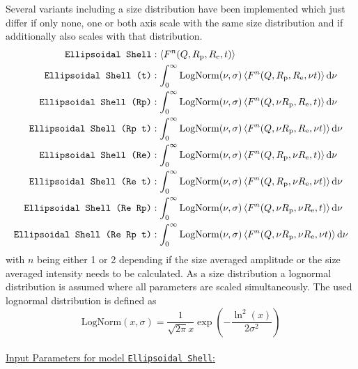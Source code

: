 Several variants including a size distribution have been implemented which just differ if only none, one or both axis scale with the same size distribution and if additionally also scales with that distribution.
\begin{align*}
\text{\texttt{Ellipsoidal Shell}}           &:                                            \left\langle F^n(Q,R_\mathrm{p},R_\mathrm{e},t)\right\rangle\\
\text{\texttt{Ellipsoidal Shell (t)}}       &: \int_0^\infty \mathrm{LogNorm}(\nu,\sigma) \left\langle F^n(Q,R_\mathrm{p},R_\mathrm{e},\nu t)\right\rangle \mathrm{d}\nu\\
\text{\texttt{Ellipsoidal Shell (Rp)}}      &: \int_0^\infty \mathrm{LogNorm}(\nu,\sigma) \left\langle F^n(Q,\nu R_\mathrm{p},R_\mathrm{e}, t)\right\rangle \mathrm{d}\nu\\
\text{\texttt{Ellipsoidal Shell (Rp t)}}    &: \int_0^\infty \mathrm{LogNorm}(\nu,\sigma) \left\langle F^n(Q,\nu R_\mathrm{p},R_\mathrm{e},\nu t)\right\rangle \mathrm{d}\nu\\
\text{\texttt{Ellipsoidal Shell (Re)}}      &: \int_0^\infty \mathrm{LogNorm}(\nu,\sigma) \left\langle F^n(Q,R_\mathrm{p},\nu R_\mathrm{e},t)\right\rangle \mathrm{d}\nu\\
\text{\texttt{Ellipsoidal Shell (Re t)}}    &: \int_0^\infty \mathrm{LogNorm}(\nu,\sigma) \left\langle F^n(Q,R_\mathrm{p},\nu R_\mathrm{e},\nu t)\right\rangle \mathrm{d}\nu\\
\text{\texttt{Ellipsoidal Shell (Re Rp)}}   &: \int_0^\infty \mathrm{LogNorm}(\nu,\sigma) \left\langle F^n(Q,\nu R_\mathrm{p},\nu R_\mathrm{e},t)\right\rangle \mathrm{d}\nu\\
\text{\texttt{Ellipsoidal Shell (Re Rp t)}} &: \int_0^\infty \mathrm{LogNorm}(\nu,\sigma) \left\langle F^n(Q,\nu R_\mathrm{p},\nu R_\mathrm{e},\nu t)\right\rangle \mathrm{d}\nu
\end{align*}
with $n$ being either 1 or 2 depending if the size averaged amplitude or the size averaged intensity needs to be calculated. As a size distribution a lognormal distribution is assumed where all parameters are scaled simultaneously. The used lognormal distribution is defined as
$$
\mathrm{LogNorm}(x,\sigma) = \frac{1}{\sqrt{2\pi}x} \exp\left(-\frac{\ln^2(x)}{2\sigma^2}\right)
$$
\vspace{0.5cm}
~\\
\underline{Input Parameters for model \texttt{Ellipsoidal Shell}:}
